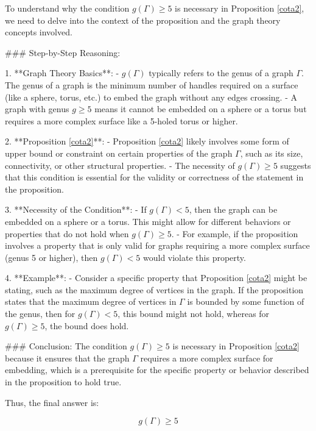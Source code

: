To understand why the condition \( g(\Gamma) \ge 5 \) is necessary in Proposition \ref{cota2}, we need to delve into the context of the proposition and the graph theory concepts involved.

### Step-by-Step Reasoning:

1. **Graph Theory Basics**:
   - \( g(\Gamma) \) typically refers to the genus of a graph \( \Gamma \). The genus of a graph is the minimum number of handles required on a surface (like a sphere, torus, etc.) to embed the graph without any edges crossing.
   - A graph with genus \( g \ge 5 \) means it cannot be embedded on a sphere or a torus but requires a more complex surface like a 5-holed torus or higher.

2. **Proposition \ref{cota2}**:
   - Proposition \ref{cota2} likely involves some form of upper bound or constraint on certain properties of the graph \( \Gamma \), such as its size, connectivity, or other structural properties.
   - The necessity of \( g(\Gamma) \ge 5 \) suggests that this condition is essential for the validity or correctness of the statement in the proposition.

3. **Necessity of the Condition**:
   - If \( g(\Gamma) < 5 \), then the graph can be embedded on a sphere or a torus. This might allow for different behaviors or properties that do not hold when \( g(\Gamma) \ge 5 \).
   - For example, if the proposition involves a property that is only valid for graphs requiring a more complex surface (genus 5 or higher), then \( g(\Gamma) < 5 \) would violate this property.

4. **Example**:
   - Consider a specific property that Proposition \ref{cota2} might be stating, such as the maximum degree of vertices in the graph. If the proposition states that the maximum degree of vertices in \( \Gamma \) is bounded by some function of the genus, then for \( g(\Gamma) < 5 \), this bound might not hold, whereas for \( g(\Gamma) \ge 5 \), the bound does hold.

### Conclusion:
The condition \( g(\Gamma) \ge 5 \) is necessary in Proposition \ref{cota2} because it ensures that the graph \( \Gamma \) requires a more complex surface for embedding, which is a prerequisite for the specific property or behavior described in the proposition to hold true.

Thus, the final answer is:

\[
\boxed{g(\Gamma) \ge 5}
\]